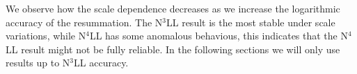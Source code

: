\documentclass[../Tesi_Jiahao_Miao_986136.tex]{subfiles}
\begin{document}
We observe how the scale dependence decreases as we increase the logarithmic accuracy of the resummation. The N$^3$LL result is the most stable under scale variations,
while N$^4$LL has some anomalous behavious, this indicates that the N$^4$LL result might not be fully reliable. In the following 
sections we will only use results up to N$^3$LL accuracy. 
\end{document}
